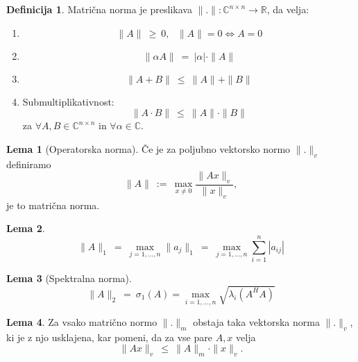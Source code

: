 \documentclass[11pt]{article}
\theoremstyle{definition}
\newtheorem{definicija}{Definicija}[section]
\newtheorem{lema}{Lema}
\begin{document}
\begin{definicija}

Matrična norma je preslikava $\|.\|: \mathbb{C}^{n \times n} \rightarrow \mathbb{R}$, da velja:
\begin{enumerate}
	\item[1)] $$\|A\| ~\geq~ 0, ~~~\|A\| = 0 \Leftrightarrow A = 0$$
	\item[2)] $$\|\alpha A\| ~=~ |\alpha| \cdot \|A\|$$
	\item[3)] $$\|A + B\| ~\leq~ \|A\| + \|B\|$$
	\item[4)] Submultiplikativnost:
	$$\|A \cdot B\| ~\leq~ \|A\| \cdot \|B\|$$
	za $\forall A, B \in \mathbb{C}^{n \times n}$ in $\forall \alpha \in \mathbb{C}$.
\end{enumerate}

\end{definicija}
\vspace{0.5cm}

\begin{lema}[Operatorska norma]

Če je za poljubno vektorsko normo $\|.\|_v$ definiramo 
$$\|A\| ~:=~ \max_{x \neq 0} \frac{\|Ax\|_v}{\|x\|_v},$$
je to matrična norma.

\end{lema}
\vspace{0.5cm}

\begin{lema}

$$\|A\|_1 ~=~ \max_{j = 1, \ldots, n} \|a_j\|_1 ~=~ \max_{j = 1, \ldots, n} \sum_{i=1}^n |a_{ij}|$$

\end{lema}
\vspace{0.5cm}

\begin{lema}[Spektralna norma]

$$\|A\|_2 ~=~ \sigma_1 (A) = \max_{i = 1, \ldots, n} \sqrt{\lambda_i (A^H A)}$$

\end{lema}
\vspace{0.5cm}

\begin{lema}

Za vsako matrično normo $\|.\|_m$ obstaja taka vektorska norma $\|.\|_v$, ki je z njo usklajena, kar pomeni, da za vse pare $A, x$ velja
$$\|A x\|_v ~\leq~ \|A\|_m \cdot \|x\|_v.$$

\end{lema}
\vspace{0.5cm}
\end{document}
